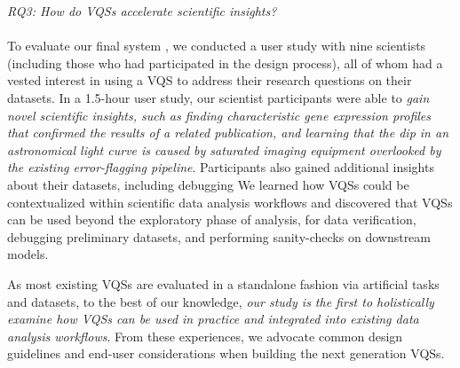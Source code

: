\emph{RQ3: How do VQSs accelerate scientific insights?}\\
\\ To evaluate our final system \zv, we conducted a user study with nine scientists (including those who had participated in the design process), all of whom had a vested interest in using a VQS to address their research questions on their datasets. In a 1.5-hour user study, our scientist participants were able to \textit{gain novel scientific insights, such as  finding characteristic gene expression profiles that confirmed the results of a related publication, and learning that the dip in an astronomical light curve is caused by saturated imaging equipment overlooked by the existing error-flagging pipeline}. 
Participants also gained additional insights about their datasets, including debugging 
We learned how VQSs could be contextualized within scientific data analysis workflows and discovered that VQSs can be used beyond the exploratory phase of analysis, for data verification, debugging preliminary datasets, and performing sanity-checks on downstream models.
\par As most existing VQSs are evaluated in a standalone fashion via artificial tasks and datasets, to the best of our knowledge, \textit{our study is the first to holistically examine how VQSs can be used in practice and integrated into existing data analysis workflows}. From these experiences, we advocate common design guidelines and end-user considerations when building the next generation VQSs.
